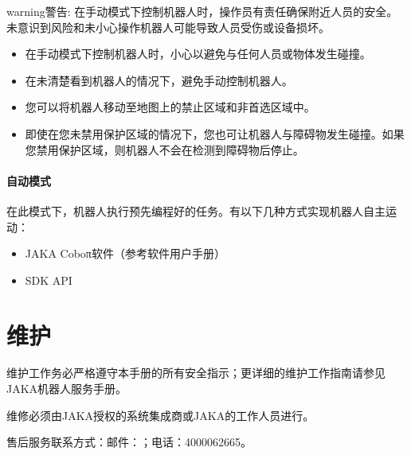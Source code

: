 \documentclass[a4paper,11pt,english,openany,oneside]{sphinxmanual}
\begin{document}
\begin{sphinxadmonition}{warning}{警告:}
\sphinxAtStartPar
在手动模式下控制机器人时，操作员有责任确保附近人员的安全。未意识到风险和未小心操作机器人可能导致人员受伤或设备损坏。
\begin{itemize}
\item {} 
\sphinxAtStartPar
在手动模式下控制机器人时，小心以避免与任何人员或物体发生碰撞。

\item {} 
\sphinxAtStartPar
在未清楚看到机器人的情况下，避免手动控制机器人。

\item {} 
\sphinxAtStartPar
您可以将机器人移动至地图上的禁止区域和非首选区域中。

\item {} 
\sphinxAtStartPar
即使在您未禁用保护区域的情况下，您也可让机器人与障碍物发生碰撞。如果您禁用保护区域，则机器人不会在检测到障碍物后停止。

\end{itemize}
\end{sphinxadmonition}


\subsubsection{自动模式}
\label{\detokenize{08 _u5b89_u88c5_u4e0e_u8c03_u8bd5:id89}}\label{\detokenize{08 _u5b89_u88c5_u4e0e_u8c03_u8bd5:id90}}
\sphinxAtStartPar
在此模式下，机器人执行预先编程好的任务。有以下几种方式实现机器人自主运动：
\begin{itemize}
\item {} 
\sphinxAtStartPar
JAKA Coboπ软件（参考软件用户手册）

\item {} 
\sphinxAtStartPar
SDK API

\end{itemize}

\sphinxstepscope


\chapter{维护}
\label{\detokenize{09 _u7ef4_u62a4:id1}}\label{\detokenize{09 _u7ef4_u62a4::doc}}
\sphinxAtStartPar
维护工作务必严格遵守本手册的所有安全指示；更详细的维护工作指南请参见 JAKA机器人服务手册。

\sphinxAtStartPar
维修必须由JAKA授权的系统集成商或JAKA的工作人员进行。

\sphinxAtStartPar
售后服务联系方式：邮件：；电话：400\sphinxhyphen{}006\sphinxhyphen{}2665。
\end{document}
